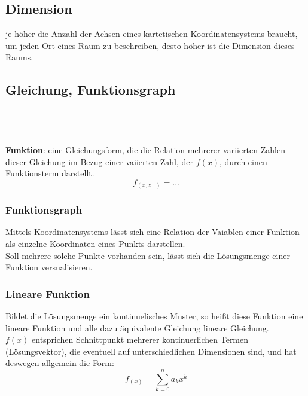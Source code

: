 \documentclass{article}
\begin{document}
    \subsection{Dimension}
    je höher die Anzahl der Achsen eines kartetischen Koordinatensystems braucht, um jeden Ort eines Raum zu beschreiben, desto höher ist die Dimension dieses Raums.
    \subsection{Gleichung, Funktionsgraph}
    
     \\\\\\
    \textbf{Funktion}: eine Gleichungsform, die die Relation mehrerer variierten Zahlen dieser Gleichung im Bezug einer vaiierten Zahl, der $f(x)$, durch einen Funktionsterm darstellt.\\
    $$f _{(x,z\dots)}=\dots$$
    \subsubsection{Funktionsgraph}
    Mittels Koordinatensystems lässt sich eine Relation der Vaiablen einer Funktion als einzelne Koordinaten eines Punkts darstellen.\\
    Soll mehrere solche Punkte vorhanden sein, lässt sich die Lösungsmenge einer Funktion versualisieren.
    \subsubsection*{Lineare Funktion}
    Bildet die Lösungsmenge ein kontinuelisches Muster, so heißt diese Funktion eine lineare Funktion und alle dazu äquivalente Gleichung lineare Gleichung.\\
    $f(x)$ entsprichen Schnittpunkt mehrerer kontinuerlichen Termen (Lösungsvektor), die eventuell auf unterschiedlichen Dimensionen sind, und hat deswegen allgemein die Form:
    $$f_{(x)}=\sum_{k=0}^{n}a_kx^k$$
    
\end{document}
